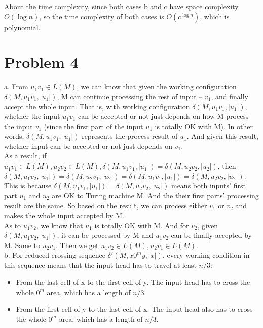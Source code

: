 \documentclass[12pt]{article}
\begin{document}
About the time complexity, since both cases b and c have space
complexity $O(\log n)$, so the time complexity of both cases is
$O(c^{\log n})$, which is polynomial.

\section*{Problem 4}

a. From $u_1v_1 \in L(M)$, we can know that given the working
configuration $\delta(M,u_1v_1, |u_1|)$, M can continue processing the
rest of input -- $v_1$, and finally accept the whole input. That is, with
working configuration $\delta(M,u_1v_1, |u_1|)$, whether the input
$u_1v_1$ can be accepted or not just depends on how M process the input
$v_1$ (since the first part of the input $u_1$ is totally OK with
M). In other words, $\delta(M,u_1v_1, |u_1|)$ represents the process
result of $u_1$. And given this result, whether input can be accepted
or not just depends on $v_1$.\\

As a result, if $u_1v_1 \in L(M), u_2v_2 \in L(M),\delta(M,u_1v_1,
|u_1|) = \delta(M,u_2v_2, |u_2|)$, then $\delta(M,u_1v_2, |u_1|) =
\delta(M,u_2v_1, |u_2|) = \delta(M,u_1v_1, |u_1|) = \delta(M,u_2v_2,
|u_2|)$. This is because $\delta(M,u_1v_1, |u_1|) = \delta(M,u_2v_2,
|u_2|)$ means both inputs' first part $u_1$ and $u_2$ are OK to Turing
machine M. And the their first parts' processing result are the
same. So based on the result,  we can process either $v_1$ or $v_2$
and makes the whole input accepted by M.\\

As to $u_1v_2$, we know that $u_1$ is totally OK with M. And for
$v_2$, given $\delta(M,u_1v_2, |u_1|)$, it can be processed by M and
$u_1v_2$ can be finally accepted by M. Same to $u_2v_1$. Then we get
$u_1v_2 \in L(M), u_2v_1 \in L(M)$.\\

b. For reduced crossing sequence $\delta'(M,x0^my,|x|)$, every working
condition in this sequence means that the input head has to travel at
least $n/3$:
\begin{itemize}
\item From the last cell of x to the first cell of y. The input head
  has to cross the whole $0^m$ area, which has a length of $n/3$.
\item From the first cell of y to the last cell of x. The input head
  also has to cross the whole $0^m$ area, which has a length of $n/3$.
\end{itemize}
\end{document}

